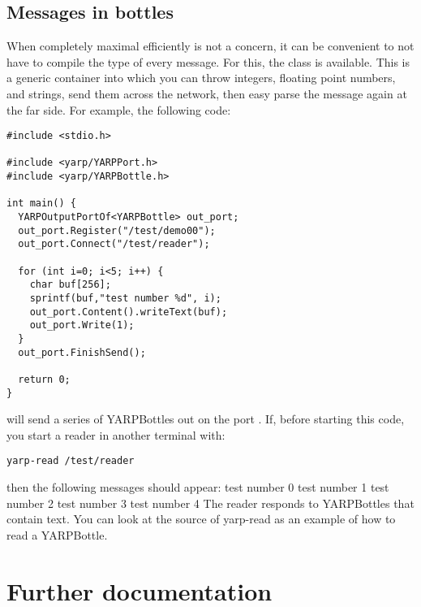







\subsection{Messages in bottles}

When completely maximal efficiently is not a concern, it can be 
convenient to not have to compile the type of every message.
For this, the  class is available.  This is a generic
container into which you can throw integers, floating point numbers,
and strings, send them across the network, then easy parse the message
again at the far side.  For example, the following code:
%
\begin{verbatim}
#include <stdio.h>

#include <yarp/YARPPort.h>
#include <yarp/YARPBottle.h>

int main() {
  YARPOutputPortOf<YARPBottle> out_port;
  out_port.Register("/test/demo00");
  out_port.Connect("/test/reader");

  for (int i=0; i<5; i++) {
    char buf[256];
    sprintf(buf,"test number %d", i);
    out_port.Content().writeText(buf);
    out_port.Write(1);
  }
  out_port.FinishSend();

  return 0;
}
\end{verbatim}
%
will send a series of YARPBottles out on the port .
If, before starting this code, you start a reader in another terminal with:
%
\begin{verbatim}
yarp-read /test/reader
\end{verbatim}
%
then the following messages should appear:
%
test number 0
test number 1
test number 2
test number 3
test number 4
%
The  reader responds to YARPBottles that contain text.
You can look at the source of yarp-read as an example of how to read 
a YARPBottle.


\section{Further documentation}


